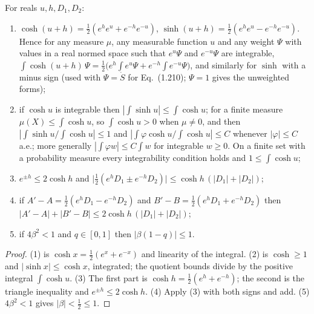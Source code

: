 \begin{lemma}
\label{lem:sg-tal:hyperbolic}
  \leanok
{}
For reals $u,h,D_1,D_2$:
\begin{enumerate}
\item $\cosh(u+h)=\frac12(e^he^u+e^{-h}e^{-u})$, $\sinh(u+h)=\frac12(e^he^u-e^{-h}e^{-u})$. Hence for any measure $\mu$, any measurable function $u$ and any weight $\Psi$ with values in a real normed space such that $e^{u}\Psi$ and $e^{-u}\Psi$ are integrable, $\int\cosh(u+h)\,\Psi=\frac12\bigl(e^h\!\int e^u\Psi+e^{-h}\!\int e^{-u}\Psi\bigr)$, and similarly for $\sinh$ with a minus sign (used with $\Psi=\dot S$ for Eq.~(1.210); $\Psi=1$ gives the unweighted forms);
\item if $\cosh u$ is integrable then $|\int\sinh u|\le\int\cosh u$; for a finite measure $\mu(X)\le\int\cosh u$, so $\int\cosh u>0$ when $\mu\ne0$, and then $|\int\sinh u/\int\cosh u|\le1$ and $|\int\varphi\cosh u/\int\cosh u|\le C$ whenever $|\varphi|\le C$ a.e.; more generally $|\int\varphi w|\le C\int w$ for integrable $w\ge0$. On a finite set with a probability measure every integrability condition holds and $1\le\int\cosh u$;
\item $e^{\pm h}\le2\cosh h$ and $\bigl|\tfrac12(e^hD_1\pm e^{-h}D_2)\bigr|\le\cosh h\,(|D_1|+|D_2|)$;
\item if $A'-A=\frac12(e^hD_1-e^{-h}D_2)$ and $B'-B=\frac12(e^hD_1+e^{-h}D_2)$ then $|A'-A|+|B'-B|\le2\cosh h\,(|D_1|+|D_2|)$;
\item if $4\beta^2<1$ and $q\in[0,1]$ then $|\beta(1-q)|\le1$.
\end{enumerate}
\end{lemma}
\begin{proof}
  \leanok
(1) is $\cosh x=\frac12(e^x+e^{-x})$ and linearity of the integral.  (2) is $\cosh\ge1$ and $|\sinh x|\le\cosh x$, integrated; the quotient bounds divide by the positive integral $\int\cosh u$.  (3) The first part is $\cosh h=\frac12(e^h+e^{-h})$; the second is the triangle inequality and $e^{\pm h}\le2\cosh h$.
(4) Apply (3) with both signs and add.  (5) $4\beta^2<1$ gives $|\beta|<\frac12\le1$.
\end{proof}

